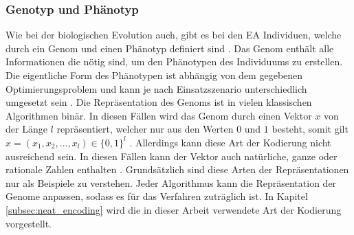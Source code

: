 \subsubsection{Genotyp und Phänotyp}
Wie bei der biologischen Evolution auch, gibt es bei den \ac{EA} Individuen, welche durch ein Genom und einen Phänotyp definiert sind \cite{weicker2015evolutionare}. Das Genom enthält alle Informationen die nötig sind, um den Phänotypen des Individuums zu erstellen. Die eigentliche Form des Phänotypen ist abhängig von dem gegebenen Optimierungsproblem und kann je nach Einsatzszenario unterschiedlich umgesetzt sein \cite{rothlauf2006representation}. Die Repräsentation des Genoms ist in vielen klassischen Algorithmen binär. In diesen Fällen wird das Genom durch einen Vektor $x$ von der Länge $l$ repräsentiert, welcher nur aus den Werten $0$ und $1$ besteht, somit gilt $x= (x_1, x_2, ..., x_l) \in \{0, 1\}^l$ \cite{rothlauf2006representation}. Allerdings kann diese Art der Kodierung nicht ausreichend sein. In diesen Fällen kann der Vektor auch natürliche, ganze oder rationale Zahlen enthalten \cite{rothlauf2006representation}. Grundsätzlich sind diese Arten der Repräsentationen nur als Beispiele zu verstehen. Jeder Algorithmus kann die Repräsentation der Genome anpassen, sodass es für das Verfahren zuträglich ist. In Kapitel \ref{subsec:neat_encoding} wird die in dieser Arbeit verwendete Art der Kodierung vorgestellt. 

